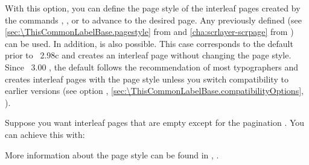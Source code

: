 \begin{Declaration}
\end{Declaration}%
With this option, you can define the page style of the interleaf pages created by the commands
,
, or
 to advance to the desired page.
Any previously defined  (see
\autoref{sec:\ThisCommonLabelBase.pagestyle} from
 and
\autoref{cha:scrlayer-scrpage} from ) can be
used. In addition,  is also possible.
This case corresponds to the default prior to \KOMAScript~2.98c and creates an
interleaf page without changing the page style. Since \KOMAScript~3.00%
, the default follows the recommendation of most
typographers and creates interleaf pages with the
page style unless you switch compatibility to earlier \KOMAScript{} versions
(see option %
,
\autoref{sec:\ThisCommonLabelBase.compatibilityOptions},
).
  \begin{Example}
    Suppose you want interleaf pages that are empty except for the pagination%
    . You can achieve this
    with:
\begin{lstcode}
\end{lstcode}
    More information about the 
    page style can be found in ,
    .
  \end{Example}
